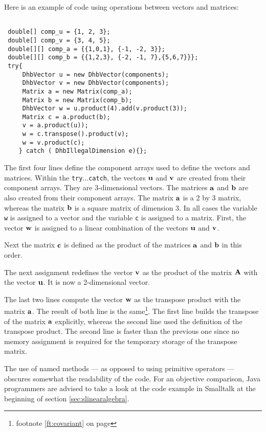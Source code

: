 \documentclass[twoside]{book}
\begin{document}
\noindent Here is an example of code using operations between
vectors and matrices:
\begin{codeExample}
\begin{verbatim}

 double[] comp_u = {1, 2, 3};
 double[] comp_v = {3, 4, 5};
 double[][] comp_a = {{1,0,1}, {-1, -2, 3}};
 double[][] comp_b = {{1,2,3}, {-2, -1, 7},{5,6,7}}};
 try{
     DhbVector u = new DhbVector(components);
     DhbVector v = new DhbVector(components);
     Matrix a = new Matrix(comp_a);
     Matrix b = new Matrix(comp_b);
     DhbVector w = u.product(4).add(v.product(3));
     Matrix c = a.product(b);
     v = a.product(u));
     w = c.transpose().product(v);
     w = v.product(c);
    } catch ( DhbIllegalDimension e){};
\end{verbatim}
\end{codeExample}
The first four lines define the component arrays used to define
the vectors and matrices. Within the {\tt try$\ldots$catch}, the
vectors ${\bf u}$ and ${\bf v}$ are created from their component
arrays. They are 3-dimensional vectors. The matrices ${\bf a}$ and
${\bf b}$ are also created from their component arrays. The matrix
${\bf a}$ is a 2 by 3 matrix, whereas the matrix ${\bf b}$ is a
square matrix of dimension 3. In all cases the variable {\tt w} is
assigned to a vector and the variable {\tt c} is assigned to a
matrix. First, the vector ${\bf w}$ is assigned to a linear
combination of the vectors ${\bf u}$ and ${\bf v}$.

Next the matrix ${\bf c}$ is defined as the product of the
matrices ${\bf a}$ and ${\bf b}$ in this order.

The next assignment redefines the vector ${\bf v}$ as the product
of the matrix ${\bf A}$ with the vector ${\bf u}$. It is now a
2-dimensional vector.

The last two lines compute the vector ${\bf w}$ as the transpose
product with the matrix ${\bf a}$. The result of both line is the
same\footnote{\cf footnote \ref{ft:covariant} on page
\pageref{ft:covariant}}. The first line builds the transpose of
the matrix ${\bf a}$ explicitly, whereas the second line used the
definition of the transpose product. The second line is faster
than the previous one since no memory assignment is required for
the temporary storage of the transpose matrix.

The use of named methods --- as opposed to using primitive
operators --- obscures somewhat the readability of the code. For
an objective comparison, Java programmers are advised to take a
look at the code example in Smalltalk at the beginning of section
\ref{sec:slinearalgebra}.
\end{document}
